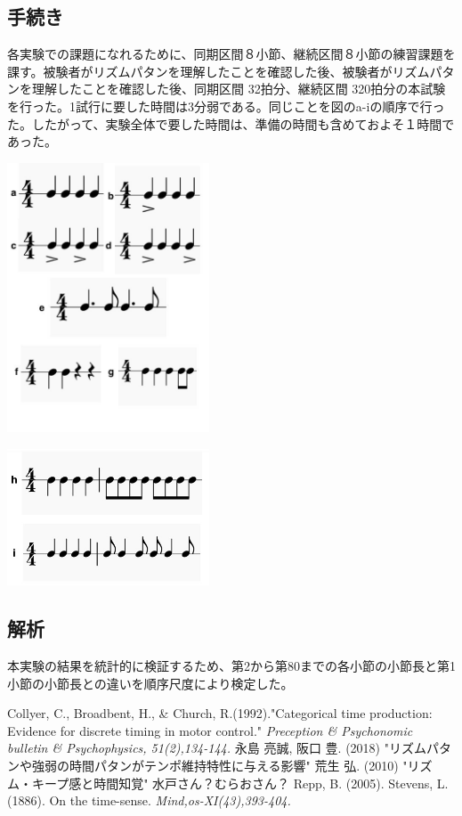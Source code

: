 \documentclass[twocolumn,10pt]{jarticle}
\begin{document}
\subsection{手続き}
各実験での課題になれるために、同期区間８小節、継続区間８小節の練習課題を課す。被験者がリズムパタンを理解したことを確認した後、被験者がリズムパタンを理解したことを確認した後、同期区間 32拍分、継続区間 320拍分の本試験を行った。1試行に要した時間は3分弱である。同じことを図のa-iの順序で行った。したがって、実験全体で要した時間は、準備の時間も含めておよそ１時間であった。
\begin{center}
	\includegraphics[width=6cm]{patna_g.jpeg}
\end{center}	
\begin{center}
	\includegraphics[width=6cm]{patnh_i.jpeg}
\end{center}	

\subsection{解析}
本実験の結果を統計的に検証するため、第2から第80までの各小節の小節長と第1小節の小節長との違いを順序尺度により検定した。





\begin{thebibliography}{99}
   Collyer, C., Broadbent, H., \& Church, R.(1992)."Categorical time production: Evidence for discrete timing in motor control." {\it Preception \& Psychonomic bulletin \& Psychophysics, 51(2),134-144.}
   永島 亮誠, 阪口 豊. (2018) "リズムパタンや強弱の時間パタンがテンポ維持特性に与える影響"
   荒生 弘. (2010) "リズム・キープ感と時間知覚"
   水戸さん？むらおさん？
   Repp, B. (2005).
   Stevens, L. (1886). On the time-sense. {\it Mind,os-XI(43),393-404.}
\end{thebibliography}
\end{document}
